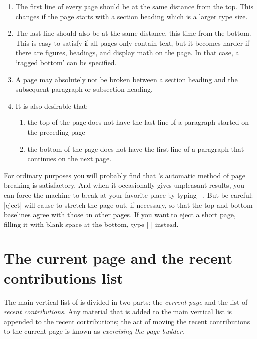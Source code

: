 \begin{enumerate}
\item The first line of every page should be at the same distance from the top. This changes
if the page starts with a section heading which is a larger type size.

\item The last line should also be at the same distance, this time from the bottom. This
is easy to satisfy if all pages only contain text, but it becomes harder if there are
figures, headings, and display math on the page. In that case, a ‘ragged bottom’ can
be specified.

\item  A page may absolutely not be broken between a section heading and the subsequent
paragraph or subsection heading.

\item It is also desirable that:
    \begin{enumerate}
      \item the top of the page does not have the last line of a paragraph started on the
       preceding page
      \item the bottom of the page does not have the first line of a paragraph that continues
      on the next page.
    \end{enumerate}
\end{enumerate}

For ordinary purposes you will probably find that \tex's automatic
method of page breaking is satisfactory. And when it occasionally gives unpleasant
results, you can force the machine to break at your favorite place by
typing |\eject|. But be careful: |eject| will cause \tex to stretch the page
out, if necessary, so that the top and bottom baselines agree with those on other
pages.  If you want to eject a short page, filling it with blank space at the bottom,
type | \vfill\eject|  instead.

\section{The current page and the recent contributions list}

The main vertical list of \tex is divided in two parts: the \emph{current page} and the list of \emph{recent
contributions}. Any material that is added to the main vertical list is appended to the recent
contributions; the act of moving the recent contributions to the current page is known as
\emph{exercising the page builder}.

